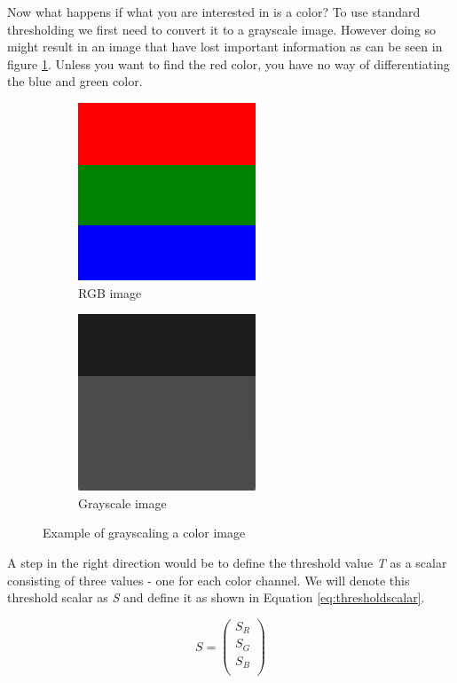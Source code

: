 Now what happens if what you are interested in is a color? To use standard thresholding we first need to convert it to a grayscale image. However doing so might result in an image that have lost important information as can be seen in figure \ref{fig:RGB2GRAY}. Unless you want to find the red color, you have no way of differentiating the blue and green color.

\begin{figure}
        \centering
        \begin{subfigure}[b]{0.3\textwidth}
                \includegraphics[scale=0.5]{img/RGB}
                \caption{RGB image}
        \end{subfigure}
		\quad
        \begin{subfigure}[b]{0.3\textwidth}
                \includegraphics[scale=0.5]{img/GrayRGB}
                \caption{Grayscale image}
        \end{subfigure}
		\caption{Example of grayscaling a color image}
		\label{fig:RGB2GRAY}
\end{figure}

A step in the right direction would be to define the threshold value \textit{T} as a scalar consisting of three values - one for each color channel. We will denote this threshold scalar as \textit{S} and define it as shown in Equation \ref{eq:thresholdscalar}.

\begin{equation}
S =  
\begin{pmatrix}
  S_{R}\\
  S_{G}\\
  S_{B}\\
\end{pmatrix}
\label{eq:thresholdscalar}
\end{equation}

